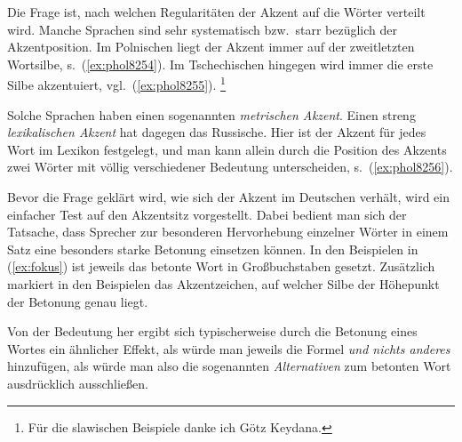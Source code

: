 Die Frage ist, nach welchen Regularitäten der Akzent auf die Wörter verteilt wird.
Manche Sprachen sind sehr systematisch bzw.\ starr bezüglich der Akzentposition.
Im Polnischen liegt der Akzent immer auf der zweitletzten Wortsilbe, s.\ (\ref{ex:phol8254}).
Im Tschechischen hingegen wird immer die erste Silbe akzentuiert, vgl.\ (\ref{ex:phol8255}).%
\footnote{Für die slawischen Beispiele danke ich Götz Keydana.}

\begin{exe}
\end{exe}

Solche Sprachen haben einen sogenannten \textit{metrischen Akzent}.
Einen streng \textit{lexikalischen Akzent} hat dagegen das Russische.
Hier ist der Akzent für jedes Wort im Lexikon festgelegt, und man kann allein durch die Position des Akzents zwei Wörter mit völlig verschiedener Bedeutung unterscheiden, s.\ (\ref{ex:phol8256}).

\begin{exe}
\end{exe}

Bevor die Frage geklärt wird, wie sich der Akzent im Deutschen verhält, wird ein einfacher Test auf den Akzentsitz vorgestellt.
Dabei bedient man sich der Tatsache, dass Sprecher zur besonderen Hervorhebung einzelner Wörter in einem Satz eine besonders starke Betonung einsetzen können.
In den Beispielen in (\ref{ex:fokus}) ist jeweils das betonte Wort in Großbuchstaben gesetzt.
Zusätzlich markiert in den Beispielen das Akzentzeichen, auf welcher Silbe der Höhepunkt der Betonung genau liegt.

\begin{exe}
  \ex\label{ex:fokus}
  \begin{xlist}
  \end{xlist}
\end{exe}

Von der Bedeutung her ergibt sich typischerweise durch die Betonung eines Wortes ein ähnlicher Effekt, als würde man jeweils die Formel \textit{und nichts anderes} hinzufügen, als würde man also die sogenannten \textit{Alternativen} zum betonten Wort ausdrücklich ausschließen.

\begin{exe}
  \ex\label{ex:fokus-deutlich}
  \begin{xlist}
  \end{xlist}
\end{exe}

